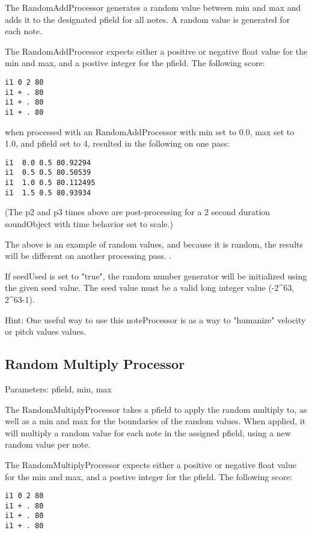 The RandomAddProcessor generates a random value between min and max and
adds it to the designated pfield for all notes. A random value is
generated for each note.

The RandomAddProcessor expects either a positive or negative float value
for the min and max, and a postive integer for the pfield. The following
score:

\begin{verbatim}
i1 0 2 80
i1 + . 80
i1 + . 80
i1 + . 80
\end{verbatim}

when processed with an RandomAddProcessor with min set to 0.0, max set
to 1.0, and pfield set to 4, resulted in the following on one pass:

\begin{verbatim}
i1  0.0 0.5 80.92294
i1  0.5 0.5 80.50539
i1  1.0 0.5 80.112495
i1  1.5 0.5 80.93934
\end{verbatim}

(The p2 and p3 times above are post-processing for a 2 second duration
soundObject with time behavior set to scale.)

The above is an example of random values, and because it is random, the
results will be different on another processing pass. .

If seedUsed is set to "true", the random number generator will be
initialized using the given seed value. The seed value must be a valid
long integer value (-2\^{}63, 2\^{}63-1).

Hint: One useful way to use this noteProcessor is as a way to "humanize"
velocity or pitch values values.


\subsection{Random Multiply Processor}\label{randomMultiplyProcessor}

Parameters: pfield, min, max

The RandomMultiplyProcessor takes a pfield to apply the random multiply
to, as well as a min and max for the boundaries of the random values.
When applied, it will multiply a random value for each note in the
assigned pfield, using a new random value per note.

The RandomMultiplyProcessor expects either a positive or negative float
value for the min and max, and a postive integer for the pfield. The
following score:

\begin{verbatim}
i1 0 2 80
i1 + . 80
i1 + . 80
i1 + . 80
\end{verbatim}

